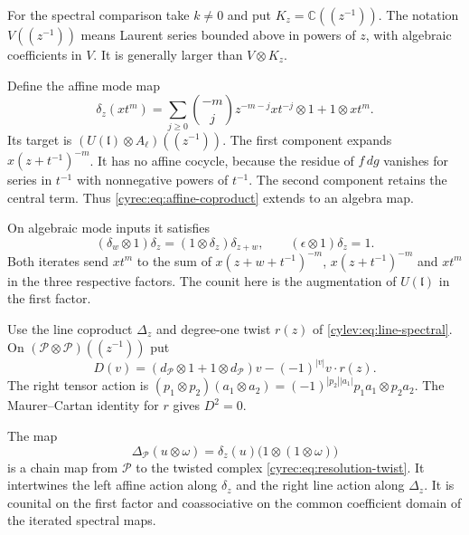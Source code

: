 For the spectral comparison take $k\ne0$ and put
$K_z=\mathbb C((z^{-1}))$. The notation $V((z^{-1}))$ means
Laurent series bounded above in powers of $z$, with algebraic
coefficients in $V$. It is generally larger than $V\otimes K_z$.

Define the affine mode map
\begin{equation}\label{cyrec:eq:affine-coproduct}
 \delta_z(xt^m)=
 \sum_{j\geq0}\binom{-m}{j}z^{-m-j}xt^{-j}\otimes1
                       +1\otimes xt^m.
\end{equation}
Its target is $(U(\mathfrak l)\otimes A_\ell)((z^{-1}))$.
The first component expands $x(z+t^{-1})^{-m}$.
It has no affine cocycle, because the residue of $f\,dg$
vanishes for series in $t^{-1}$ with nonnegative powers of
$t^{-1}$. The second component retains the central term.
Thus \eqref{cyrec:eq:affine-coproduct} extends to an algebra map.

On algebraic mode inputs it satisfies
\begin{equation}\label{cyrec:eq:affine-coassociativity}
 (\delta_w\otimes1)\delta_z
       =(1\otimes\delta_z)\delta_{z+w},
 \qquad (\epsilon\otimes1)\delta_z=1.
\end{equation}
Both iterates send $xt^m$ to the sum of
$x(z+w+t^{-1})^{-m}$, $x(z+t^{-1})^{-m}$ and $xt^m$ in
the three respective factors. The counit here is the augmentation
of $U(\mathfrak l)$ in the first factor.

Use the line coproduct $\Delta_z$ and degree-one twist $r(z)$
of \eqref{cylev:eq:line-spectral}. On
$(\mathcal P\otimes\mathcal P)((z^{-1}))$ put
\begin{equation}\label{cyrec:eq:resolution-twist}
 D(v)=(d_{\mathcal P}\otimes1+1\otimes d_{\mathcal P})v
                              -(-1)^{|v|}v\cdot r(z).
\end{equation}
The right tensor action is
$(p_1\otimes p_2)(a_1\otimes a_2)
=(-1)^{|p_2||a_1|}p_1a_1\otimes p_2a_2$.
The Maurer--Cartan identity for $r$ gives $D^2=0$.

\begin{theorem}\label{cyrec:thm:resolution-coproduct}
The map
\begin{equation}\label{cyrec:eq:resolution-coproduct}
 \Delta_{\mathcal P}(u\otimes\omega)
       =\delta_z(u)\bigl(1\otimes(1\otimes\omega)\bigr)
\end{equation}
is a chain map from $\mathcal P$ to the twisted complex
\eqref{cyrec:eq:resolution-twist}. It intertwines the left
affine action along $\delta_z$ and the right line action along
$\Delta_z$. It is counital on the first factor and coassociative
on the common coefficient domain of the iterated spectral maps.
\end{theorem}

